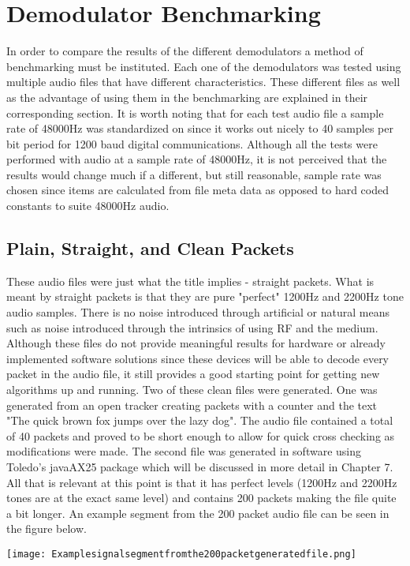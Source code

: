 \chapter{Demodulator Benchmarking}
In order to compare the results of the different demodulators a method of benchmarking must be instituted. Each one of the demodulators was tested using multiple audio files that have different characteristics. These different files as well as the advantage of using them in the benchmarking are explained in their corresponding section. It is worth noting that for each test audio file a sample rate of 48000Hz was standardized on since it works out nicely to 40 samples per bit period for 1200 baud digital communications. Although all the tests were performed with audio at a sample rate of 48000Hz, it is not perceived that the results would change much if a different, but still reasonable, sample rate was chosen since items are calculated from file meta data as opposed to hard coded constants to suite 48000Hz audio.

\section{Plain, Straight, and Clean Packets}
These audio files were just what the title implies - straight packets. What is meant by straight packets is that they are pure "perfect" 1200Hz and 2200Hz tone audio samples. There is no noise introduced through artificial or natural means such as noise introduced through the intrinsics of using RF and the medium. Although these files do not provide meaningful results for hardware or already implemented software solutions since these devices will be able to decode every packet in the audio file, it still provides a good starting point for getting new algorithms up and running. Two of these clean files were generated. One was generated from an open tracker creating packets with a counter and the text "The quick brown fox jumps over the lazy dog". The audio file contained a total of 40 packets and proved to be short enough to allow for quick cross checking as modifications were made. The second file was generated in software using Toledo's javaAX25 package which will be discussed in more detail in Chapter 7. All that is relevant at this point is that it has perfect levels (1200Hz and 2200Hz tones are at the exact same level) and contains 200 packets making the file quite a bit longer. An example segment from the 200 packet audio file can be seen in the figure below.
\begin{Figure}
  \centering
	\texttt{[image: Examplesignalsegmentfromthe200packetgeneratedfile.png]} 
\end{Figure}

